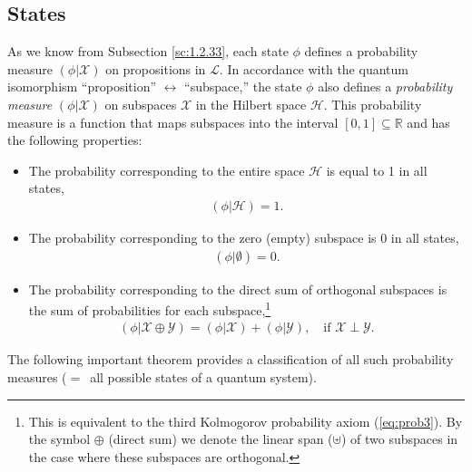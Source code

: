 \documentclass[nochecklpage]{stefan1}
\theoremstyle{definition}
\begin{document}
\subsection{States}\label{ss:states}
As we know from Subsection \ref{sc:1.2.33}, each state $ \phi $ defines a
probability measure $ (\phi | \mathcal{X}) $ on propositions in
$ \mathcal{L} $. In accordance with the quantum isomorphism
``proposition'' $ \leftrightarrow $ ``subspace,'' the state $ \phi $ also
defines a \emph{probability measure}
$(\phi | \mathscr{X}) $ on subspaces $ \mathscr{X} $ in the Hilbert
space $ \mathscr{H} $. This probability measure is a function that maps
subspaces into the interval $ [0,1] \subseteq \mathbb{R} $ and has the
following properties:
%
\begin{itemize}
\item  The probability corresponding to the entire space
$ \mathscr{H} $ is equal to 1 in all states,
\begin{align}
(\phi |\mathscr{H}) = 1. \label{eq:prob1x}
\end{align}

\item  The probability corresponding to the zero (empty)
subspace is 0 in all states,
\begin{align}
(\phi |\emptyset ) = 0. \label{eq:prob2x}
\end{align}

\item  The probability corresponding to the direct sum of
orthogonal subspaces is the sum of probabilities for each
subspace,\footnote{This is equivalent to the third Kolmogorov
probability axiom (\ref{eq:prob3}). By the symbol $ \oplus $ (direct
sum) we denote the linear span ($ \uplus $) of two subspaces in the case
where these subspaces are orthogonal.}
\begin{align}
(\phi |\mathscr{X} \oplus \mathscr{Y}) = (\phi |\mathscr{X}) + ( \phi |
\mathscr{Y}), \quad \mbox{if } \mathscr{X} \perp \mathscr{Y.} \label{eq:prob3x}
\end{align}
\end{itemize}
%
The following important theorem \cite{Gleason} provides a
classification of all such probability measures ($=$~all possible states
of a quantum system).
\end{document}
